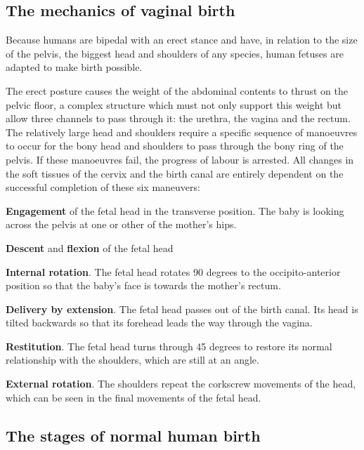 \documentclass[12pt,a4paper,onecolumn]{article}
\begin{document}
\subsection{The mechanics of vaginal birth}

Because humans are bipedal with an erect stance and have, in relation to the size of the pelvis, the
biggest head and shoulders of any species, human fetuses are adapted to make birth possible.

The erect posture causes the weight of the abdominal contents to thrust on the pelvic floor, a
complex structure which must not only support this weight but allow three channels to pass through
it: the urethra, the vagina and the rectum. The relatively large head and shoulders require a
specific sequence of manoeuvres to occur for the bony head and shoulders to pass through the bony
ring of the pelvis. If these manoeuvres fail, the progress of labour is arrested. All changes in the
soft tissues of the cervix and the birth canal are entirely dependent on the successful completion
of these six maneuvers:

\begin{wuxch_enum}
\item \textbf{Engagement} of the fetal head in the transverse position. The baby is looking across
  the pelvis at one or other of the mother's hips.
\item \textbf{Descent} and \textbf{flexion} of the fetal head
\item \textbf{Internal rotation}. The fetal head rotates 90 degrees to the occipito-anterior
  position so that the baby's face is towards the mother's rectum.
\item \textbf{Delivery by extension}. The fetal head passes out of the birth canal. Its head is
  tilted backwards so that its forehead leads the way through the vagina.
\item \textbf{Restitution}. The fetal head turns through 45 degrees to restore its normal
  relationship with the shoulders, which are still at an angle.
\item \textbf{External rotation}. The shoulders repeat the corkscrew movements of the head, which
  can be seen in the final movements of the fetal head.
\end{wuxch_enum}

\subsection{The stages of normal human birth}
\end{document}
